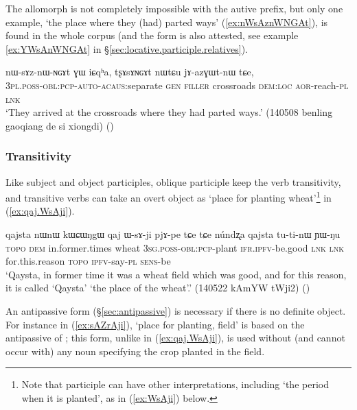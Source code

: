 The  allomorph is not completely impossible with the autive  prefix, but only one example,  `the place where they (had) parted ways' (\ref{ex:nWsAznWNGAt}), is found in the whole corpus (and the form  is also attested, see example \ref{ex:YWsAnWNGAt} in §\ref{sec:locative.participle.relatives}).

\begin{exe}
\ex \label{ex:nWsAznWNGAt}
\gll  nɯ-sɤz-nɯ-ɴɢɤt ɣɯ iɕqʰa, tʂɤsɤɴɢɤt nɯtɕu jɤ-azɣɯt-nɯ tɕe, \\
\textsc{3pl}.\textsc{poss}-\textsc{obl}:\textsc{pcp}-\textsc{auto}-\textsc{acaus}:separate \textsc{gen} \textsc{filler}  crossroads \textsc{dem}:\textsc{loc} \textsc{aor}-reach-\textsc{pl} \textsc{lnk} \\
\glt `They arrived at the crossroads where they had parted ways.' (140508 benling gaoqiang de si xiongdi)
()
\end{exe} 

\subsubsection{Transitivity} \label{sec:oblique.participle.transitivity}
Like subject and object participles, oblique participle keep the verb transitivity, and transitive verbs can take an overt object as  `place for planting wheat'\footnote{Note that participle  can have other interpretations, including `the period when it is planted', as in (\ref{ex:WsAji}) below. } in (\ref{ex:qaj.WsAji}).

\begin{exe}
\ex \label{ex:qaj.WsAji}
\gll  qajsta nɯnɯ kɯɕɯŋgɯ qaj ɯ-sɤ-ji pjɤ-pe tɕe tɕe núndʐa qajsta tu-ti-nɯ ɲɯ-ŋu \\
\textsc{topo} \textsc{dem} in.former.times wheat \textsc{3sg}.\textsc{poss}-\textsc{obl}:\textsc{pcp}-plant \textsc{ifr}.\textsc{ipfv}-be.good \textsc{lnk} \textsc{lnk} for.this.reason  \textsc{topo} \textsc{ipfv}-say-\textsc{pl} \textsc{sens}-be \\
\glt `Qaysta, in former time it was a wheat field which was good, and for this reason, it is called `Qaysta' `the place of the wheat'.' (140522 kAmYW tWji2) ()
\end{exe}

An antipassive form (§\ref{sec:antipassive}) is necessary if there is no definite object. For instance in (\ref{ex:sAZrAji}),  `place for planting, field' is based on the  antipassive of ; this form, unlike  in (\ref{ex:qaj.WsAji}), is used without (and cannot occur with) any noun specifying the crop planted in the field.

